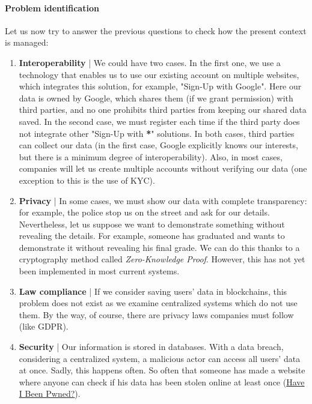 \paragraph{Problem identification}
Let us now try to answer the previous questions to check how the present 
context is managed:
\begin{enumerate}
    \item \textbf{Interoperability} | We could have two cases. In the first one, 
    we use a technology that enables us to use our existing account on 
    multiple websites, which integrates this solution, for example, "Sign-Up 
    with Google". Here our data is owned by Google, which shares them (if we 
    grant permission) with third parties, and no one prohibits third parties 
    from keeping our shared data saved. In the second case, we must register 
    each time if the third party does not integrate other "Sign-Up with \textbf{*}" 
    solutions. In both cases, third parties can collect our data (in the 
    first case, Google explicitly knows our interests, but there is a minimum
    degree of interoperability). Also, in most cases, companies will let us 
    create multiple accounts without verifying our data (one exception to 
    this is the use of KYC).
    \item \textbf{Privacy} | In some cases, we must show our data
    with complete transparency: for example, the police stop us on the 
    street and ask for our details. Nevertheless, let us suppose we want to 
    demonstrate something without revealing the details. For example, 
    someone has graduated and wants to demonstrate it without revealing 
    his final grade. We can do this thanks to a cryptography method 
    called \textit{Zero-Knowledge Proof}. However, this has not yet been
    implemented in most current systems.
    \item \textbf{Law compliance} | If we consider saving users' data in 
    blockchains, this problem does not exist as we examine centralized 
    systems which do not use them. By the way, of course, there are privacy 
    laws companies must follow (like GDPR).
    \item \textbf{Security} | Our information is stored in databases. With 
    a data breach, considering a centralized system, a malicious actor can 
    access all users' data at once. Sadly, this happens often. So often 
    that someone has made a website where anyone can check if his data has 
    been stolen online at least once (\href{https://haveibeenpwned.com/}
    {Have I Been Pwned?}).
\end{enumerate}


